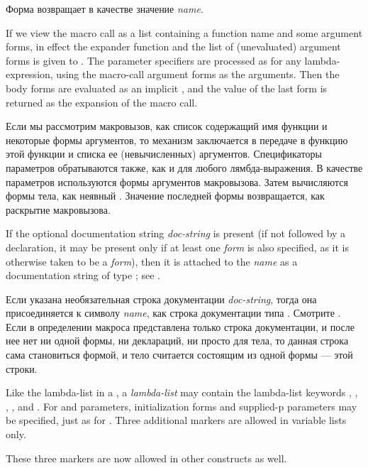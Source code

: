 \begin{defmac}
Форма  возвращает в качестве значение \emph{name}.

If we view the 
macro call as a list containing a function name and some argument forms,
in effect the expander function and the list of (unevaluated) argument
forms is given to .
The parameter specifiers are processed as for any lambda-expression,
using the macro-call argument forms as the arguments.
Then the body forms are evaluated
as an implicit , and the value of the last form
is returned as the expansion of the macro call.

Если мы рассмотрим макровызов, как список содержащий имя функции и некоторые
формы аргументов, то механизм заключается в передаче в функцию  этой
функции и списка ее (невычисленных) аргументов.
Спецификаторы параметров обратываются также, как и для любого лямбда-выражения.
В качестве параметров используются формы аргументов макровызова.
Затем вычисляются формы тела, как неявный . Значение последней формы
возвращается, как раскрытие макровызова.

If the optional documentation string \emph{doc-string} is present (if not
followed by a declaration, it may be
present only if at least one \emph{form} is also specified, as it is
otherwise taken to be a \emph{form}), then it is attached to the \emph{name}
as a documentation string of type ; see .

Если указана необязательная строка документации \emph{doc-string}, тогда она
присоединяется к символу \emph{name}, как строка документации типа
. Смотрите .
Если в определении макроса представлена только строка документации, и после нее
нет ни одной формы, ни деклараций, ни просто для тела, то данная строка сама
становиться формой, и тело считается состоящим из одной формы --- этой строки.

\begin{obsolete}
Like the lambda-list in a , a  \emph{lambda-list} may contain
the lambda-list keywords , , ,
, and .
For  and  parameters, initialization forms and
supplied-p parameters may be specified, just as for .
Three additional markers
are allowed in  variable lists only.
\end{obsolete}
\begin{new}
These three markers are now allowed in other constructs as well.


\end{new}
\end{defmac}

